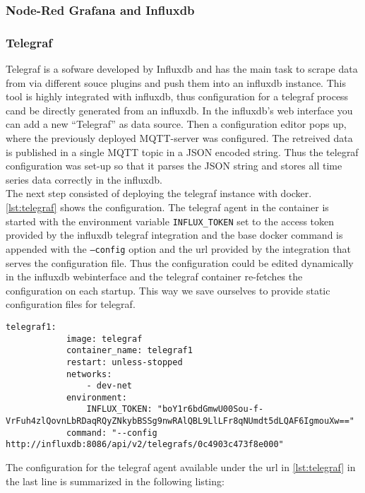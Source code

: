 	\subsubsection{Node-Red Grafana and Influxdb}
	
	\subsubsection{Telegraf}
		Telegraf is a sofware developed by Influxdb and has the main task to scrape data from via different souce plugins and push them into an influxdb instance. This tool is highly integrated with influxdb, thus configuration for a telegraf process cand be directly generated from an influxdb. In the influxdb's web interface you can add a new \enquote{Telegraf} as data source. Then a configuration editor pops up, where the previously deployed \ac{MQTT}-server was configured. The retreived data is published in a single \ac{MQTT} topic in a \ac{JSON} encoded string. Thus the telegraf configuration was set-up so that it parses the \ac{JSON} string and stores all time series data correctly in the influxdb.\\
		The next step consisted of deploying the telegraf instance with docker. \cref{lst:telegraf} shows the configuration. The telegraf agent in the container is started with the environment variable \texttt{INFLUX\_TOKEN} set to the access token provided by the influxdb telegraf integration and the base docker command is appended with the \texttt{--config} option and the url provided by the integration that serves the configuration file. Thus the configuration could be edited dynamically in the influxdb webinterface and the telegraf container re-fetches the configuration on each startup. This way we save ourselves to provide static configuration files for telegraf.
		
		\begin{lstlisting}[tabsize=2, gobble=4, caption={docker-compose.yml configuration for telegraf}, label=lst:telegraf]
		telegraf1:
			image: telegraf
			container_name: telegraf1
			restart: unless-stopped
			networks:
				- dev-net
			environment:
				INFLUX_TOKEN: "boY1r6bdGmwU00Sou-f-VrFuh4zlQovnLbRDaqRQyZNkybBSSg9nwRAlQBL9LlLFr8qNUmdt5dLQAF6IgmouXw=="
			command: "--config http://influxdb:8086/api/v2/telegrafs/0c4903c473f8e000"
		\end{lstlisting}
		
		The configuration for the telegraf agent available under the url in \cref{lst:telegraf} in the last line is summarized in the following listing:
		
